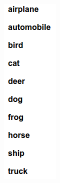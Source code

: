 \documentclass{beamer}
\begin{document}
\begin{frame}
\begin{columns}
\begin{column}{.14\textwidth}
\includegraphics[width=\linewidth]{label.png}
\end{column}
\end{columns}
\end{frame}
\end{document}
